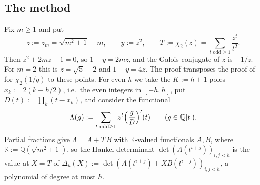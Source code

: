 \documentclass[11pt]{amsart}
\theoremstyle{definition}
\theoremstyle{remark}
\numberwithin{equation}{section}
\newcommand{\QQ}{\mathbb{Q}}
\newcommand{\KK}{\mathbb{K}}
\begin{document}
\subsection{The method}\label{sec:method}
Fix $m\ge1$ and put
\[
  z:=z_m=\sqrt{m^2+1}-m,\qquad y:=z^2,\qquad T:=\chi_2(z)=\sum_{t\text{ odd}\ge1}\frac{z^t}{t^2}.
\]
Then $z^2+2mz-1=0$, so $1-y=2mz$, and the Galois conjugate of $z$ is $-1/z$. For $m=2$ this is $z=\sqrt5-2$ and $1-y=4z$.
The proof transposes the proof of \cite{Chi2Paper} for $\chi_2(1/q)$ to these points. For even $h$ we take the $K:=h+1$
poles $x_k:=2(k-h/2)$, i.e.\ the even integers in $[-h,h]$, put $D(t):=\prod_k(t-x_k)$, and consider the functional
\[
  \Lambda(g):=\sum_{t\text{ odd}\ge1}z^t\Bigl(\frac{g}{D}\Bigr)'(t)\qquad(g\in\QQ[t]).
\]
Partial fractions give $\Lambda=A+T\,B$ with $\KK$-valued functionals $A,B$, where $\KK:=\QQ(\sqrt{m^2+1})$, so the Hankel
determinant $\det(\Lambda(t^{i+j}))_{i,j<h}$ is the value at $X=T$ of $\Delta_h(X):=\det(A(t^{i+j})+XB(t^{i+j}))_{i,j<h}$,
a polynomial of degree at most $h$.
\end{document}
